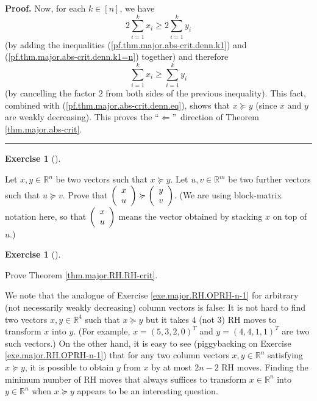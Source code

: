 \documentclass[numbers=enddot,12pt,final,onecolumn,notitlepage]{scrartcl}%
\newcounter{exer}
\numberwithin{exer}{subsection}
\theoremstyle{definition}
\newtheorem{exmp}[exer]{Exercise}
\newenvironment{exercise}[1][]
{\begin{exmp}[#1]\begin{leftbar}}
{\end{leftbar}\end{exmp}}
\newenvironment{proof}[1][Proof]{\noindent\textbf{#1.} }{\ \rule{0.5em}{0.5em}}
\let\sumnonlimits\sum
\renewcommand{\sum}{\sumnonlimits\limits}
\begin{document}
\begin{proof}
Now, for each $k\in\left[  n\right]  $, we have%
\[
2\sum_{i=1}^{k}x_{i}\geq2\sum_{i=1}^{k}y_{i}%
\]
(by adding the inequalities (\ref{pf.thm.major.abs-crit.denn.k1}) and
(\ref{pf.thm.major.abs-crit.denn.k1=n}) together) and therefore
\[
\sum_{i=1}^{k}x_{i}\geq\sum_{i=1}^{k}y_{i}%
\]
(by cancelling the factor $2$ from both sides of the previous inequality).
This fact, combined with (\ref{pf.thm.major.abs-crit.denn.eq}), shows that
$x\succcurlyeq y$ (since $x$ and $y$ are weakly decreasing). This proves the
\textquotedblleft$\Longleftarrow$\textquotedblright\ direction of Theorem
\ref{thm.major.abs-crit}.
\end{proof}

\begin{exercise}
 Let $x,y\in\mathbb{R}^{n}$ be two vectors such that $x\succcurlyeq
y$. Let $u,v\in\mathbb{R}^{m}$ be two further vectors such that $u\succcurlyeq
v$. Prove that $\left(
\begin{array}
[c]{c}%
x\\
u
\end{array}
\right)  \succcurlyeq\left(
\begin{array}
[c]{c}%
y\\
v
\end{array}
\right)  $. (We are using block-matrix notation here, so that $\left(
\begin{array}
[c]{c}%
x\\
u
\end{array}
\right)  $ means the vector obtained by stacking $x$ on top of $u$.)
\end{exercise}

\begin{exercise}
 Prove Theorem \ref{thm.major.RH.RH-crit}.
\end{exercise}

We note that the analogue of Exercise \ref{exe.major.RH.OPRH-n-1} for
arbitrary (not necessarily weakly decreasing) column vectors is false: It is
not hard to find two vectors $x,y\in\mathbb{R}^{4}$ such that $x\succcurlyeq
y$ but it takes $4$ (not $3$) RH moves to transform $x$ into $y$. (For
example, $x=\left(  5,3,2,0\right)  ^{T}$ and $y=\left(  4,4,1,1\right)  ^{T}$
are two such vectors.) On the other hand, it is easy to see (piggybacking on
Exercise \ref{exe.major.RH.OPRH-n-1}) that for any two column vectors
$x,y\in\mathbb{R}^{n}$ satisfying $x\succcurlyeq y$, it is possible to obtain
$y$ from $x$ by at most $2n-2$ RH moves. Finding the minimum number of RH
moves that always suffices to transform $x\in\mathbb{R}^{n}$ into
$y\in\mathbb{R}^{n}$ when $x\succcurlyeq y$ appears to be an interesting question.
\end{document}
